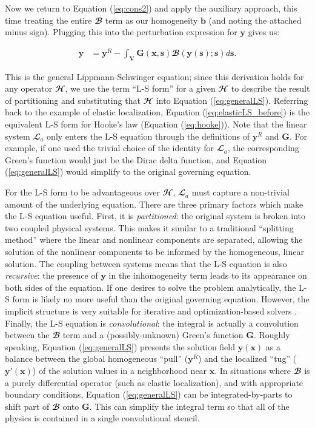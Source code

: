 \documentclass[3p, preprint]{elsarticle}
\newcommand{\bmx}{\bm{x}}
\newcommand{\bms}{\bm{s}}
\newcommand{\bmy}{\bm{y}}
\newcommand{\Gop}{\bm{G}}
\newcommand{\Linop}{\mathbfcal{L}}
\newcommand{\Aop}{\Linop_a}
\newcommand{\Hop}{\mathbfcal{H}}
\newcommand{\Bop}{\mathbfcal{B}}
\newenvironment{revision} {} {}
\begin{document}
\noindent Now we return to Equation (\ref{eq:cons2}) and apply the auxiliary approach, this time treating the entire $\Bop$ term as our homogeneity $\bm{b}$ (and noting the attached minus sign). Plugging this into the perturbation expression for $\bmy$ gives us:

\begin{align}
\bmy &= \bmy^R - \int_{\bm{V}} \bm{G}(\bmx, \bms) \Bop(\bmy(\bms); \bms) d\bms .
\label{eq:generalLS} 
\end{align}

\noindent This is the \begin{revision}general\end{revision} Lippmann-Schwinger equation; \begin{revision} since this derivation holds for any operator $\Hop$, we use the term ``L-S form'' for a given $\Hop$ to describe the result of partitioning and substituting that $\Hop$ into Equation (\ref{eq:generalLS}). Referring back to the example of elastic localization, Equation (\ref{eq:elasticLS_before}) is the equivalent L-S form for Hooke's law (Equation (\ref{eq:hooke})).\end{revision} Note that the linear system $\Aop$ only enters the L-S equation through the definitions of $\bmy^R$ and $\Gop$. For example, if one used the trivial choice of the identity for $\Aop$, the corresponding Green's function would just be the Dirac delta function, and Equation (\ref{eq:generalLS}) would simplify to the original governing equation.

For the L-S form to be advantageous over $\Hop$, $\Aop$ must capture a non-trivial amount of the underlying equation. There are three primary factors which make the L-S equation useful. First, it is \textit{partitioned}: the original system is broken into two coupled physical systems. This makes it similar to a traditional ``splitting method'' where the linear and nonlinear components are separated, allowing the solution of the nonlinear components to be informed by the homogeneous, linear solution. The coupling between systems means that the L-S equation is also \textit{recursive}: the presence of $\bmy$ in the inhomogeneity term leads to its appearance on both sides of the equation. If one desires to solve the problem analytically, the L-S form is likely no more useful than the original governing equation. However, the implicit structure is very suitable for iterative and optimization-based solvers \cite{michel2001_fft,lebensohn2013_crystal}. Finally, the L-S equation is \textit{convolutional}: the integral is actually a convolution between the $\Bop$ term and a (possibly-unknown) Green's function $\Gop$.
Roughly speaking, Equation (\ref{eq:generalLS}) presents the solution field $\bmy(\bmx)$ as a balance between the global homogeneous ``pull'' ($\bmy^R$) and the localized ``tug'' ($\bmy'(\bmx)$) of the solution values in a neighborhood near $\bmx$. In situations where $\Bop$ is a purely differential operator (such as  elastic localization), and with appropriate boundary conditions, Equation (\ref{eq:generalLS}) can be integrated-by-parts to shift part of $\Bop$ onto $\Gop$. This can simplify the integral term so that all of the physics is contained in a single convolutional stencil.
\end{document}
